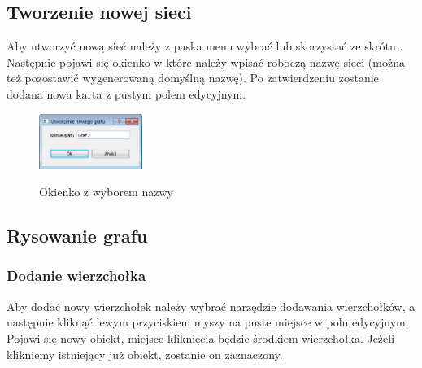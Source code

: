 \subsection{Tworzenie nowej sieci}
Aby utworzyć nową sieć należy z paska menu wybrać  lub skorzystać ze skrótu . Następnie pojawi się okienko w które należy wpisać roboczą nazwę sieci (można też pozostawić wygenerowaną domyślną nazwę). Po zatwierdzeniu zostanie dodana nowa karta z pustym polem edycyjnym.
\begin{figure}[H]
	\centering
	\includegraphics[width=0.3\textwidth]{./img/spec_zew02}
	\label{fig:nowyGrafMsgbox}
	\caption{Okienko z wyborem nazwy}
\end{figure}
\subsection{Rysowanie grafu}
\subsubsection{Dodanie wierzchołka}
Aby dodać nowy wierzchołek należy wybrać narzędzie dodawania wierzchołków, a następnie kliknąć lewym przyciskiem myszy na puste miejsce w polu edycyjnym. Pojawi się nowy obiekt, miejsce kliknięcia będzie środkiem wierzchołka. Jeżeli klikniemy istniejący już obiekt, zostanie on zaznaczony.
